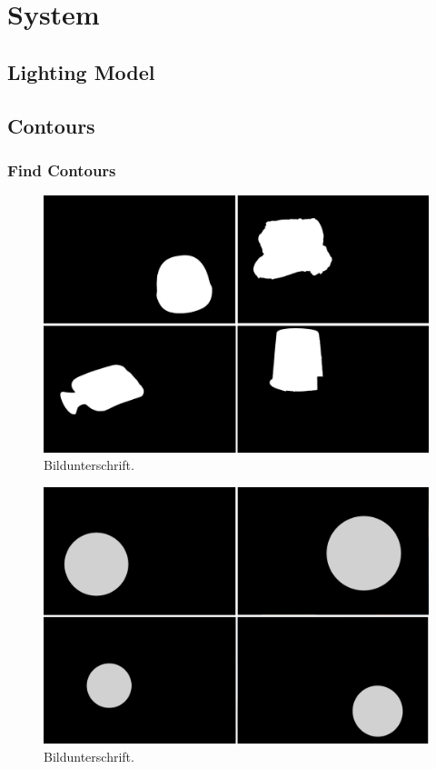 \section{System}\label{sec:System}

\subsection{Lighting Model}\label{sec:lightingmodel}

\subsection{Contours}\label{sec:contours}
\subsubsection{Find Contours}\label{sec:findContours}
\begin{figure}[H] 
	\center 
	\includegraphics[width=12cm]{Images/batch1_mask.jpg}			
	\caption[Bildunterschrift]{Bildunterschrift.}
	\label{fig:batch1mask}
\end{figure}

\begin{figure}[H] 
	\center 
	\includegraphics[width=12cm]{Images/batch2_mask.jpg}			
	\caption[Bildunterschrift]{Bildunterschrift.}
	\label{fig:batch2mask}
\end{figure}

